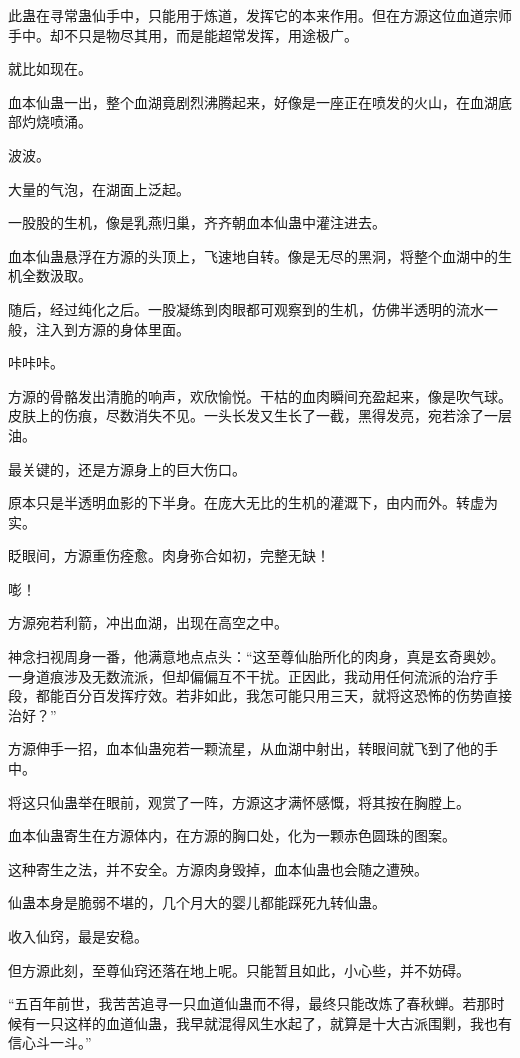 \begin{this_body}
此蛊在寻常蛊仙手中，只能用于炼道，发挥它的本来作用。但在方源这位血道宗师手中。却不只是物尽其用，而是能超常发挥，用途极广。

就比如现在。

血本仙蛊一出，整个血湖竟剧烈沸腾起来，好像是一座正在喷发的火山，在血湖底部灼烧喷涌。

波波。

大量的气泡，在湖面上泛起。

一股股的生机，像是乳燕归巢，齐齐朝血本仙蛊中灌注进去。

血本仙蛊悬浮在方源的头顶上，飞速地自转。像是无尽的黑洞，将整个血湖中的生机全数汲取。

随后，经过纯化之后。一股凝练到肉眼都可观察到的生机，仿佛半透明的流水一般，注入到方源的身体里面。

咔咔咔。

方源的骨骼发出清脆的响声，欢欣愉悦。干枯的血肉瞬间充盈起来，像是吹气球。皮肤上的伤痕，尽数消失不见。一头长发又生长了一截，黑得发亮，宛若涂了一层油。

最关键的，还是方源身上的巨大伤口。

原本只是半透明血影的下半身。在庞大无比的生机的灌溉下，由内而外。转虚为实。

眨眼间，方源重伤痊愈。肉身弥合如初，完整无缺！

嘭！

方源宛若利箭，冲出血湖，出现在高空之中。

神念扫视周身一番，他满意地点点头：“这至尊仙胎所化的肉身，真是玄奇奥妙。一身道痕涉及无数流派，但却偏偏互不干扰。正因此，我动用任何流派的治疗手段，都能百分百发挥疗效。若非如此，我怎可能只用三天，就将这恐怖的伤势直接治好？”

方源伸手一招，血本仙蛊宛若一颗流星，从血湖中射出，转眼间就飞到了他的手中。

将这只仙蛊举在眼前，观赏了一阵，方源这才满怀感慨，将其按在胸膛上。

血本仙蛊寄生在方源体内，在方源的胸口处，化为一颗赤色圆珠的图案。

这种寄生之法，并不安全。方源肉身毁掉，血本仙蛊也会随之遭殃。

仙蛊本身是脆弱不堪的，几个月大的婴儿都能踩死九转仙蛊。

收入仙窍，最是安稳。

但方源此刻，至尊仙窍还落在地上呢。只能暂且如此，小心些，并不妨碍。

“五百年前世，我苦苦追寻一只血道仙蛊而不得，最终只能改炼了春秋蝉。若那时候有一只这样的血道仙蛊，我早就混得风生水起了，就算是十大古派围剿，我也有信心斗一斗。”


\end{this_body}
